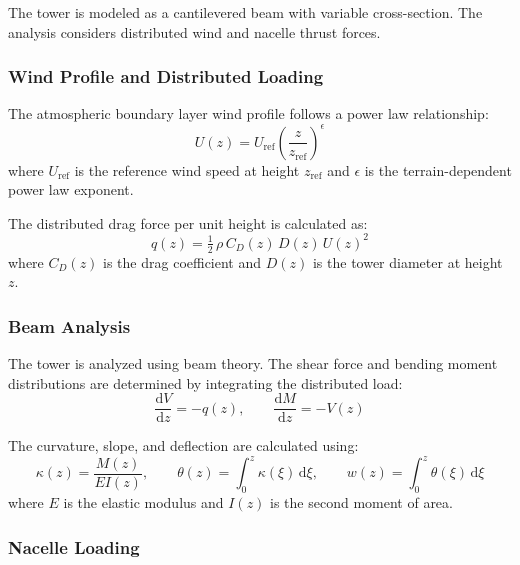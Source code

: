\documentclass[11pt]{article}
\begin{document}
The tower is modeled as a cantilevered beam with variable cross-section. The analysis considers distributed wind and nacelle thrust forces.

\subsubsection{Wind Profile and Distributed Loading}

The atmospheric boundary layer wind profile follows a power law relationship:
\begin{equation}
 U(z) = U_{\text{ref}}\left(\frac{z}{z_{\text{ref}}}\right)^{\epsilon}
\label{eq:wind_profile}
\end{equation}
where $U_{\text{ref}}$ is the reference wind speed at height $z_{\text{ref}}$ and $\epsilon$ is the terrain-dependent power law exponent.

The distributed drag force per unit height is calculated as:
\begin{equation}
 q(z) = \tfrac{1}{2}\,\rho\,C_D(z)\,D(z)\,U(z)^2
\label{eq:distributed_drag}
\end{equation}
where $C_D(z)$ is the drag coefficient and $D(z)$ is the tower diameter at height $z$.

\subsubsection{Beam Analysis}

The tower is analyzed using beam theory. The shear force and bending moment distributions are determined by integrating the distributed load:
\begin{equation}
 \frac{\mathrm{d}V}{\mathrm{d}z} = -q(z), \qquad \frac{\mathrm{d}M}{\mathrm{d}z} = -V(z)
\label{eq:shear_moment}
\end{equation}

The curvature, slope, and deflection are calculated using:
\begin{equation}
 \kappa(z) = \frac{M(z)}{E I(z)}, \qquad \theta(z) = \int_0^{z} \kappa(\xi)\,\mathrm{d}\xi, \qquad w(z) = \int_0^{z} \theta(\xi)\,\mathrm{d}\xi
\label{eq:deflection}
\end{equation}
where $E$ is the elastic modulus and $I(z)$ is the second moment of area.

\subsubsection{Nacelle Loading}
\end{document}
